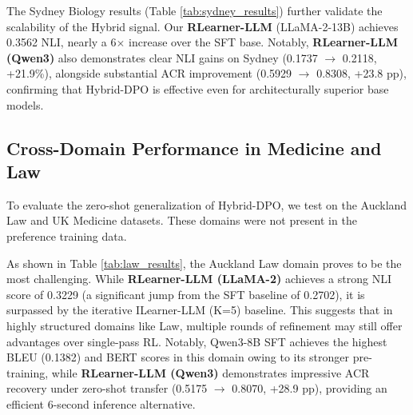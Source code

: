 The Sydney Biology results (Table \ref{tab:sydney_results}) further validate the scalability of the Hybrid signal. Our \textbf{RLearner-LLM} (LLaMA-2-13B) achieves 0.3562 NLI, nearly a 6$\times$ increase over the SFT base. Notably, \textbf{RLearner-LLM (Qwen3)} also demonstrates clear NLI gains on Sydney (0.1737 $\rightarrow$ 0.2118, +21.9\%), alongside substantial ACR improvement (0.5929 $\rightarrow$ 0.8308, +23.8 pp), confirming that Hybrid-DPO is effective even for architecturally superior base models.

\begin{table}[h]
\centering
{}
\caption{Experimental performance on the Sydney Biology dataset. \textbf{RLearner-LLM} maintains cross-domain stability. Qwen3-8B RLearner-LLM achieves +21.9\% NLI and +23.8 pp ACR improvement over its SFT baseline.}
\label{tab:sydney_results}
\end{table}

\subsection{Cross-Domain Performance in Medicine and Law}
To evaluate the zero-shot generalization of Hybrid-DPO, we test on the Auckland Law and UK Medicine datasets. These domains were not present in the preference training data.

As shown in Table \ref{tab:law_results}, the Auckland Law domain proves to be the most challenging. While \textbf{RLearner-LLM (LLaMA-2)} achieves a strong NLI score of 0.3229 (a significant jump from the SFT baseline of 0.2702), it is surpassed by the iterative ILearner-LLM (K=5) baseline. This suggests that in highly structured domains like Law, multiple rounds of refinement may still offer advantages over single-pass RL. Notably, Qwen3-8B SFT achieves the highest BLEU (0.1382) and BERT scores in this domain owing to its stronger pre-training, while \textbf{RLearner-LLM (Qwen3)} demonstrates impressive ACR recovery under zero-shot transfer (0.5175 $\rightarrow$ 0.8070, +28.9 pp), providing an efficient 6-second inference alternative.

